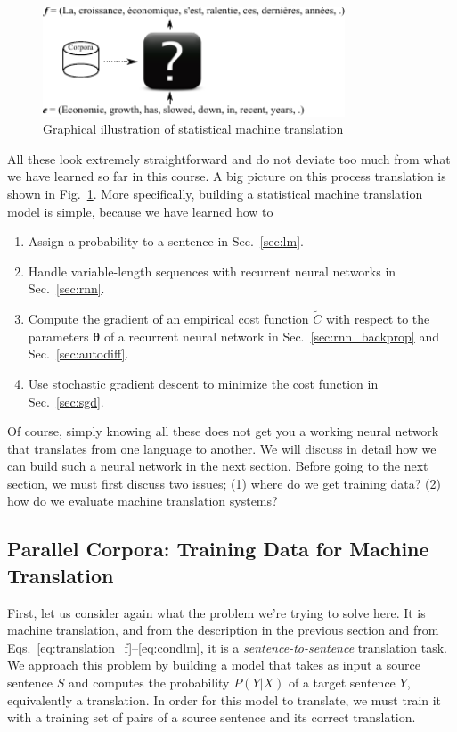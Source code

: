\documentclass{report}
\newcommand{\vects}[1]{\boldsymbol{#1}}
\newcommand{\TT}[0]{\vects{\theta}}
\begin{document}
\begin{figure}[t]
    \centering
    \includegraphics[width=0.8\textwidth]{figures/smt1.pdf}
    \caption{Graphical illustration of statistical machine translation}
    \label{fig:smt}
\end{figure}

All these look extremely straightforward and do not deviate too much from what
we have learned so far in this course. A big picture on this process translation
is shown in Fig.~\ref{fig:smt}.  More specifically, building a statistical
machine translation model is simple, because we have learned how to 
\begin{enumerate}
    \itemsep 0em
    \item Assign a probability to a sentence in
        Sec.~\ref{sec:lm}.
    \item Handle variable-length sequences with recurrent
        neural networks in Sec.~\ref{sec:rnn}.
    \item Compute the gradient of an empirical cost function $\tilde{C}$ with
        respect to the parameters $\TT$ of a recurrent neural network in
        Sec.~\ref{sec:rnn_backprop} and Sec.~\ref{sec:autodiff}.
    \item Use stochastic gradient descent to minimize the cost function in
        Sec.~\ref{sec:sgd}.
\end{enumerate}

Of course, simply knowing all these does not get you a working neural network
that translates from one language to another. We will discuss in detail how we
can build such a neural network in the next section. Before going to the next
section, we must first discuss two issues; (1) where do we get training data?
(2) how do we evaluate machine translation systems?

\subsection{Parallel Corpora: Training Data for Machine Translation}
\label{sec:parallel_corpora}

First, let us consider again what the problem we're trying to solve here. It is
machine translation, and from the description in the previous section and from
Eqs.~\eqref{eq:translation_f}--\eqref{eq:condlm}, it is a {\em
sentence-to-sentence} translation task. We approach this problem by building a
model that takes as input a source sentence $S$ and computes the probability
$P(Y|X)$ of a target sentence $Y$, equivalently a translation. In order for this
model to translate, we must train it with a training set of pairs of a source
sentence and its correct translation.
\end{document}
